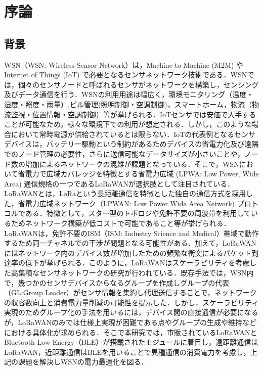 \chapter{序論}

\section{背景}
WSN（WSN: Wireless Sensor Network）は，Machine to Machine (M2M) やInternet of Things (IoT) で必要となるセンサネットワーク技術である．WSNでは，個々のセンサノードと呼ばれるセンサがネットワークを構築し，センシング及びデータ通信を行う．WSNの利用用途は幅広く，環境モニタリング（温度・湿度・照度・雨量）,ビル管理(照明制御・空調制御)，スマートホーム，物流（物流監視・位置情報・空調制御）等が挙げられる\cite{Farooq2018}．IoTセンサでは安価で入手することが可能なため，様々な環境下での利用が想定される．しかし，このような場合において常時電源が供給されているとは限らない．IoTの代表例となるセンサデバイスは，バッテリー駆動という制約があるためデバイスの省電力化及び遠隔でのノード管理の必要性，さらに送信可能なデータサイズが小さいことや，ノード数の増加によるネットワークの混雑が課題となっている．そこで，WSNにおいて省電力で広域カバレッジを特徴とする省電力広域 (LPWA: Low Power, Wide Area) 通信規格の一つであるLoRaWANが選択肢として注目されている．
LoRaWANとは，LoRaという長距離通信を特徴とした独自の通信方式を採用した，省電力広域ネットワーク（LPWAN: Low Power Wide Area Network) プロトコルである．特徴として，スター型のトポロジや免許不要の周波帯を利用しているためネットワーク構築が低コストで可能であること等が挙げられる．LoRaWANは，免許不要のISM（ISM: Industry Science and Medical）帯域で動作するため同一チャネルでの干渉が問題となる可能性がある\cite{Adelantado2017}．加えて，LoRaWANにはネットワーク内のデバイス数が増加したための頻繁な衝突によるパケット到達率の低下が挙げられる\cite{Adelantado2017}．このように，LoRaWANはスケーラビリティを考慮した高集積なセンサネットワークの研究が行われている．既存手法\cite{2017}では，WSN内で，幾つかのセンサデバイスからなるグループを作成しグループの代表（GL:Group Leader）がセンサ情報を集約し代理送信することで，ネットワークの収容数向上と消費電力量削減の可能性を提示した．しかし，スケーラビリティ実現のためグループ化の手法を用いるには，デバイス間の直接通信が必要になるが，LoRaWANのみでは仕様上実現が困難である点やグループの生成や維持などにおける具体化が求められる．そこで本研究では，市販されているLoRaWANとBluetooth Low Energy（BLE）が搭載されたモジュールに着目し，遠距離通信はLoRaWAN，近距離通信はBLEを用いることで異種通信の消費電力を考慮し，上記の課題を解決しWSNの電力最適化を図る．

